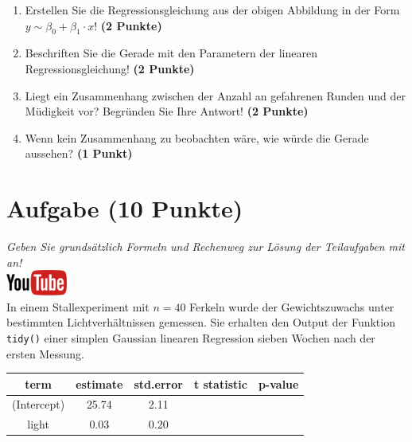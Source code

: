 \documentclass[a4paper, 10pt]{scrartcl}\usepackage[]{graphicx}\usepackage[]{xcolor}
\begin{document}
\begin{enumerate}
\item Erstellen Sie die Regressionsgleichung aus der obigen Abbildung in
  der Form $y \sim \beta_0 + \beta_1 \cdot x$! \textbf{(2 Punkte)}
\item Beschriften Sie die Gerade mit den Parametern der linearen
  Regressionsgleichung! \textbf{(2 Punkte)}
\item Liegt ein Zusammenhang zwischen der Anzahl an gefahrenen Runden und
  der M{\"u}digkeit vor? Begr{\"u}nden Sie Ihre Antwort! \textbf{(2 Punkte)}
\item Wenn kein Zusammenhang zu beobachten w{\"a}re, wie w{\"u}rde die Gerade aussehen? \textbf{(1 Punkt)}
\end{enumerate} 
\clearpage

\section{Aufgabe \hfill (10 Punkte)}

\textit{Geben Sie grunds{\"a}tzlich Formeln und Rechenweg zur L{\"o}sung der
  Teilaufgaben mit an!} \\[1Ex]

\hfill\href{https://youtu.be/lJp8rFmMnrs}{\includegraphics[width =
  2cm]{img/youtube}}\\[1Ex]



In einem Stallexperiment mit $n = 40$ Ferkeln wurde der
Gewichtszuwachs unter bestimmten Lichtverh{\"a}ltnissen gemessen. Sie erhalten
den \Rlogo Output der Funktion \texttt{tidy()} einer simplen Gaussian linearen
Regression sieben Wochen nach der ersten Messung.

\begin{table}[!h]
\centering\begingroup\fontsize{14}{16}\selectfont

\begin{tabular}{ccccc}
\toprule
term & estimate & std.error & t statistic & p-value\\
\midrule
(Intercept) & 25.74 & 2.11 &  & \\
light & 0.03 & 0.20 &  & \\
\bottomrule
\end{tabular}
\endgroup{}
\end{table}
\end{document}

